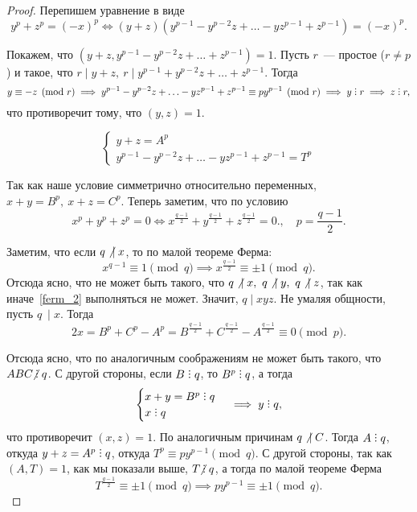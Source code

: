 	\begin{proof}
		Перепишем уравнение в виде 
		\[ 
			y^p + z^p = (-x)^p \Leftrightarrow (y + z)(y^{p - 1} - y^{p - 2}z + \ldots - y z^{p - 1} + z^{p - 1}) = (-x)^{p}.
		\]

		Покажем, что $(y + z, y^{p - 1} - y^{p - 2}z + \ldots + z^{p - 1}) = 1$. Пусть $r$~--- простое ($r \neq p$) и такое, что $r \mid y + z, \ r \mid y^{p - 1} + y^{p - 2}z + \ldots + z^{p - 1}$. Тогда 
		\[
			y \equiv -z \pmod{r} \implies y^{p - 1} - y^{p - 2}z + \ldots - y z^{p - 1} + z^{p - 1} \equiv p y^{p - 1} \pmod{r} \implies y \divby r \implies z \divby r,
		\]
		что противоречит  тому, что $(y, z) = 1$. 
		
		\[
			\begin{cases} 
				y + z = A^p \\
				y^{p - 1} - y^{p - 2}z + \ldots - y z^{p - 1} + z^{p - 1} = T^p
			\end{cases}
		\]

		Так как наше условие симметрично относительно переменных, $x + y = B^p, \ x + z = C^p$. Теперь заметим, что по условию 
		\begin{equation}
				x^p + y^p + z^p = 0 \Leftrightarrow x^{\frac{q - 1}{2}} + y^{\frac{q - 1}{2}} + z^{\frac{q - 1}{2}} = 0. \label{ferm_2}, \quad p = \frac{q - 1}{2}.
		\end{equation}

		Заметим, что если $q \not \ \mid x$,  то по малой теореме Ферма:
		\[
				x^{q - 1} \equiv 1 \pmod{q} \implies x^{\frac{q - 1}{2}} \equiv \pm 1 \pmod{q}.
			\]	
		Отсюда ясно, что не может быть такого, что $q \not \ \mid x, \ q \not \ \mid y, \ q \not \ \mid z$, так как иначе~\ref{ferm_2} выполняться не может.  Значит, $q \mid xyz$.  Не умаляя общности, пусть $q \ \mid x$. Тогда 
		\[
			2x = B^p + C^p - A^p = B^{\frac{q - 1}{2}} + C^{\frac{q - 1}{2}} - A^{\frac{q - 1}{2}} \equiv 0 \pmod{p}.
		\]

		Отсюда ясно, что по аналогичным соображениям не может быть такого, что $ABC \notdivby q$. С другой стороны, если $B \divby q$, то $B^p \divby q$, а тогда 
		\[
			\begin{cases} x + y = B^p \divby q \\ x \divby q \end{cases}  \implies y \divby q,
		\]
		что противоречит $(x, z) = 1$. По аналогичным причинам $q \not \ \mid C$. Тогда $A \divby q$, откуда $y + z = A^p \divby q$, откуда $T^p \equiv py^{p - 1} \pmod{q}$. С другой стороны, так как $(A, T) = 1$, как мы показали выше, $T \notdivby q$, а тогда по малой теореме Ферма 
		\begin{equation}
			T^{\frac{q - 1}{2}} \equiv \pm 1 \pmod{q} \implies p y^{p - 1} \equiv \pm 1 \pmod{q}.   \label{ferm_3}
		\end{equation}
		

\end{proof}
